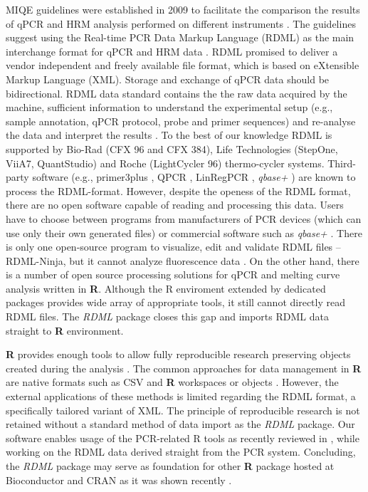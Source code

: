 \documentclass{bioinfo}
\begin{document}
	MIQE guidelines were established in 2009 to facilitate the comparison the
	results of qPCR and HRM analysis performed on different instruments
	\cite{bustin_miqe_2009, huggett_2013}. The guidelines suggest using the
	Real-time PCR Data Markup Language (RDML) as the main interchange format for
	qPCR and HRM data \cite{rdml-ninja_2015}. RDML promised to deliver a vendor
	independent and freely available file format, which is based on eXtensible
	Markup Language (XML). Storage and exchange of qPCR data should be
	bidirectional. RDML data standard contains the the raw data acquired by the
	machine, sufficient information to understand the experimental setup (e.g.,
	sample annotation, qPCR protocol, probe and primer sequences) and re-analyse the
	data and interpret the results \cite{lefever_rdml:_2009}. To the best of our
	knowledge RDML is supported by Bio-Rad (CFX 96 and CFX 384), Life Technologies
	(StepOne, ViiA7, QuantStudio) and Roche (LightCycler 96) thermo-cycler systems.
	Third-party software (e.g., primer3plus \cite{untergasser_2007}, QPCR
	\cite{pabinger_2009}, LinRegPCR \cite{ruijter_2014}, \textit{qbase+}
	\cite{hellemans_2007}) are known to process the RDML-format. However, despite
	the openess of the RDML format, there are no open software capable of reading
	and processing this data. Users have to choose between programs from
	manufacturers of PCR devices (which can use only their own generated files) or
	commercial software such as \textit{qbase+} \cite{rdml}. There is only one
	open-source program to visualize, edit and validate RDML files -- RDML-Ninja,
	but it cannot analyze fluorescence data \cite{rdml-ninja_2015}. On the other
	hand, there is a number of open source processing solutions for qPCR 
	\cite{ritz_qpcr:_2008, rodiger2015chippcr} and melting curve analysis 
	\cite{roediger_RJ_2013,cousins_2012} written in \textbf{R}. 
	Although the R enviroment extended by dedicated packages provides wide array of
	appropriate tools, it still cannot directly read RDML files. 
	The \textit{RDML} package closes this gap and imports RDML data straight to
	\textbf{R} environment.
	
	
	\textbf{R} provides enough tools to allow fully reproducible research preserving objects 
	created during the analysis \cite{liu_2014}. The common approaches for data management 
	in \textbf{R} are native formats such as CSV and \textbf{R} workspaces or objects
	\cite{rodiger_rkward_2012, pabinger_2014, RDCT2014c}. However, the external applications of these 
	methods is limited regarding the RDML format, a specifically tailored variant of XML. 
	The principle of reproducible research is not retained without a standard method of data import as
	the \textit{RDML} package. Our software enables usage of the PCR-related R tools as recently 
	reviewed in \cite{pabinger_2014}, while working on the RDML data derived straight from the PCR system.
	Concluding, the \textit{RDML} package may serve as foundation for other \textbf{R} package
	hosted at Bioconductor \cite{gentleman_2004} and CRAN \cite{RCT} as it was shown
	recently \cite{rodiger2015r}.
	
\end{document}
